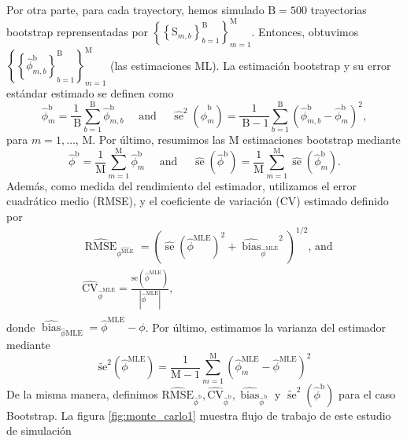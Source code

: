 Por otra parte, para cada trayectory, hemos simulado $\mathrm{B}=500$ trayectorias bootstrap reprensentadas por $\left\{\left\{\mathrm{S}_{m, b}\right\}_{b=1}^{\mathrm{B}}\right\}_{m=1}^{\mathrm{M}}$. Entonces, obtuvimos $\left\{\left\{\hat{\phi}_{m, b}^{\mathrm{b}}\right\}_{b=1}^{\mathrm{B}}\right\}_{m=1}^{\mathrm{M}}$ 
(las estimaciones ML). La estimación bootstrap y su error estándar estimado se definen como
$$
\hat{\phi}_m^{\mathrm{b}}=\frac{1}{\mathrm{~B}} \sum_{b=1}^{\mathrm{B}} \hat{\phi}_{m, b}^{\mathrm{b}} \quad \text { and } \quad \widehat{\operatorname{se}}^2\left(\hat{\phi}_m^{\mathrm{b}}\right)=\frac{1}{\mathrm{~B}-1} \sum_{b=1}^{\mathrm{B}}\left(\hat{\phi}_{m, b}^{\mathrm{b}}-\hat{\phi}_m^{\mathrm{b}}\right)^2,
$$
para $m=1, \ldots$, M. Por último, resumimos las M estimaciones bootstrap mediante
$$
\hat{\phi}^{\mathrm{b}}=\frac{1}{\mathrm{M}} \sum_{m=1}^{\mathrm{M}} \hat{\phi}_m^{\mathrm{b}} \quad \text { and } \quad \widehat{\operatorname{se}}\left(\hat{\phi}^{\mathrm{b}}\right)=\frac{1}{\mathrm{M}} \sum_{m=1}^{\mathrm{M}} \widehat{\operatorname{se}}\left(\hat{\phi}_m^{\mathrm{b}}\right) .
$$
Además, como medida del rendimiento del estimador, utilizamos el error cuadrático medio (RMSE), y el coeficiente de variación (CV) estimado definido por
$$
\begin{aligned}
& \widehat{\operatorname{RMSE}}_{\hat{\phi^{\mathrm{MLE}}}}=\left(\widehat{\operatorname{se}}\left(\hat{\phi}^{\mathrm{MLE}}\right)^2+{\widehat{\operatorname{bias}}_{{\hat{\phi}}^{\mathrm{MLE}}}}^2\right)^{1 / 2} \text {, and } \\
& \widehat{\mathrm{CV}}_{\hat{\phi}^{\mathrm{MLE}}}=\frac{\widehat{\mathrm{se}}\left(\hat{\phi}^{\mathrm{MLE}}\right)}{\left|\hat{\phi}^{\mathrm{MLE}}\right|}, \\
&
\end{aligned}
$$
donde $\widehat{\operatorname{bias}}_{\hat{\phi} \mathrm{MLE}}=\hat{\phi}^{\mathrm{MLE}}-\phi$. Por último, estimamos la varianza del estimador mediante
$$
\widetilde{\mathrm{se}}^2\left(\hat{\phi}^{\mathrm{MLE}}\right)=\frac{1}{\mathrm{M}-1} \sum_{m=1}^{\mathrm{M}}\left(\hat{\phi}_m^{\mathrm{MLE}}-\hat{\phi}^{\mathrm{MLE}}\right)^2
$$
De la misma manera, definimos $\widehat{\mathrm{RMSE}}_{\hat{\phi}^{\mathrm{b}}}, \widehat{\mathrm{CV}}_{\hat{\phi}^{\mathrm{b}}}, \widehat{\operatorname{bias}}_{\hat{\phi}^{\mathrm{b}}}$ y $\widetilde{\operatorname{se}}^2\left(\hat{\phi}^{\mathrm{b}}\right)$ para el caso Bootstrap. La figura \ref{fig:monte_carlo1} muestra flujo de trabajo de este estudio de simulación

